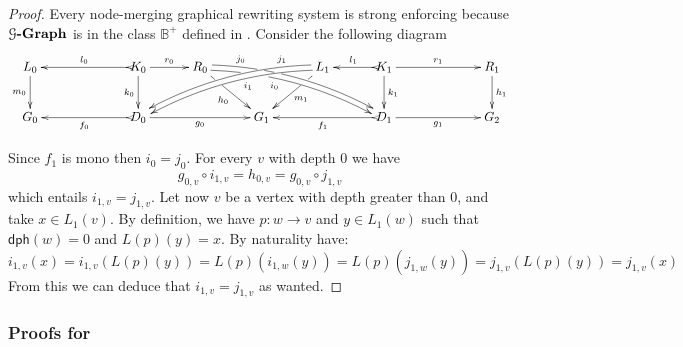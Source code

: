 \documentclass[a4paper,UKenglish,cleveref,pdftex,thm-restate,numberwithinsect,anonymous]{lipics}
\newcommand{\gph}[1]{\mathcal{G}\textbf{\textup{-Graph}}}
\newcommand{\dph}{\mathsf{dph}}
\def\G{\textbf {\textup{G}}}
\begin{document}
\lemVTame*
\label{lemVTame}


\begin{proof}
	Every node-merging graphical rewriting system is strong enforcing because $\gph{G}$ is in the class $\mathbb{B}^+$ defined in .  Consider the following diagram 
	\[\xymatrix@R=25pt@C=30pt{L_0 \ar[d]_{m_0}&& K_0
		\ar[d]_{k_0}\ar@{>->}[ll]_{l_0} \ar[r]^{r_0} & R_0
		\ar@<-.5ex>@/^.35cm/[drrr]|(.23)\hole|(.34)\hole_(.4){i_0} 	\ar@<.5ex>@/^.35cm/[drrr]^(.2){j_0}|(.31)\hole |(.4)\hole
		\ar[dr]|(.3)\hole_{h_0} && L_1 \ar@<.5ex>@/_.35cm/[dlll]^(.4){i_1} \ar@<-.5ex>@/_.35cm/[dlll]_(.2){j_1}
		\ar[dl]|(.3)\hole^{m_1}& K_1 \ar[d]^{k_1}\ar@{>->}[l]_{l_1}
		\ar[rr]^{r_1} && R_1 \ar[d]^{h_1}\\G_0 && \ar@{>->}[ll]^{f_0}
		D_0 \ar[rr]_{g_0}&& G_1 && \ar@{>->}[ll]^{f_1} D_1
		\ar[rr]_{g_1}&& G_2}\] 
	
	Since $f_1$ is mono then $i_0=j_0$. For every $v$ with depth $0$ we have
	\[g_{0,v}\circ i_{1,v}=h_{0,v}=g_{0,v}\circ j_{1,v}\]
	which entails $i_{1,v}=j_{1,v}$. Let now $v$ be a vertex with depth greater than $0$, and take $x\in L_1(v)$. By definition, we have $p:w\to v$ and $y\in L_{1}(w)$  such that $\dph(w)=0$ and $L(p)(y)=x$. By naturality have:
	\[i_{1,v}(x)=i_{1,v}(L(p)(y))=L(p)(i_{1, w}(y))=L(p)(j_{1, w}(y))=j_{1,v}(L(p)(y))=j_{1,v}(x)\]
	From this we can deduce that $i_{1,v}=j_{1,v}$ as wanted.
\end{proof}

\iffalse 
\subsubsection{Proofs for }
\end{document}
